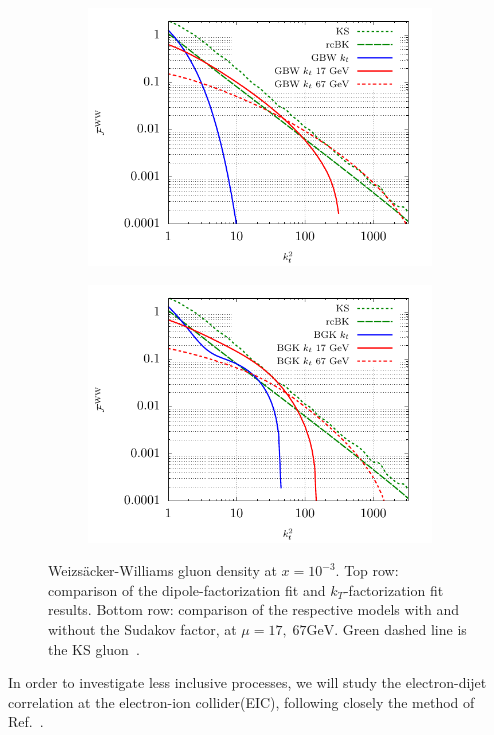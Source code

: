 \documentclass[12pt]{article}
\numberwithin{equation}{section}
\numberwithin{table}{section}
\numberwithin{figure}{section}
\begin{document}
\begin{figure}[t]
\begin{subfigure}{0.5\textwidth}
        \includegraphics[width=\textwidth]{plots/GBWWW2} 
    \end{subfigure}
    \begin{subfigure}{0.5\textwidth}
        \includegraphics[width=\textwidth]{plots/BGKWW2} 
    \end{subfigure}
    \caption{\footnotesize Weizs\"acker-Williams gluon density at $x=10^{-3}$. Top row: comparison of the dipole-factorization fit and $k_T$-factorization fit results. Bottom row: comparison of the respective models with and without the Sudakov factor, at $\mu=17,\;67 \mathrm{GeV}$. Green dashed line is the KS gluon~\cite{vanHameren:2021sqc}. }
    \label{fig:ww}
\end{figure}
In order to investigate less inclusive processes, we will study the electron-dijet correlation at the electron-ion collider(EIC), following closely the method of Ref.~\cite{vanHameren:2021sqc}. 
\end{document}
